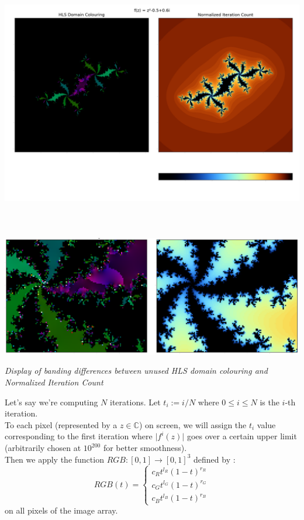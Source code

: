 \documentclass{article}
\newcommand\C{\mathbb{C}}
\begin{document}
\begin{multicols}{2}
\includegraphics[scale=0.3]{hls_v_nic}
\columnbreak
\text{ } \\
\text{ } \\
\text{ } \\
\text{ } \\ %
\hspace{15mm}
\includegraphics[scale=0.2]{hls_v_nic_zoom} \\
\end{multicols}
\vspace{-15mm}
\begin{center}
\textit{Display of banding differences between unused HLS domain colouring and Normalized Iteration Count}
\end{center}


Let's say we're computing $N$ iterations. Let $t_i := i/N$ where $0 \leq i \leq N$ is the $i$-th iteration. \\
To each pixel (represented by a $z \in \C$) on screen, we will assign the $t_i$ value corresponding to the first iteration where $\lvert f^{i}(z) \rvert$ goes over a certain upper limit (arbitrarily chosen at $10^{200}$ for better smoothness). \\
Then we apply the function $RGB : [0,1] \to [0,1]^3$ defined by : \\
$$RGB(t) = \begin{cases}
c_Rt^{l_R}(1-t)^{r_R} \\
c_Gt^{l_G}(1-t)^{r_G} \\
c_Bt^{l_B}(1-t)^{r_B}
\end{cases}$$
on all pixels of the image array. \\
\vspace{5mm}
\end{document}
